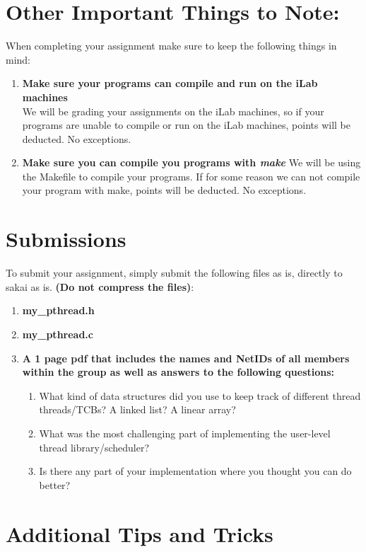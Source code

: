 \documentclass{article}
\begin{document}
\section*{Other Important Things to Note:}
When completing your assignment make sure to keep the following things in mind:
\begin{enumerate}
\item \textbf{Make sure your programs can compile and run on the iLab machines}\\
We will be grading your assignments on the iLab machines, so if your programs are unable to compile or run on the iLab machines, points will be deducted. No exceptions.
\item \textbf{Make sure you can compile you programs with \textit{make}}
We will be using the Makefile to compile your programs. If for some reason we can not compile your program with make, points will be deducted. No exceptions.
\end{enumerate}


\section*{Submissions}
To submit your assignment, simply submit the following files as is, directly to sakai as is. \textbf{(Do not compress
the files)}:
\begin{enumerate}
\item \textbf{my\_pthread.h}
\item \textbf{my\_pthread.c}
\item \textbf{A 1 page pdf that includes the names and NetIDs of all members within the group as well as answers to the following questions:}
\begin{enumerate}[a]
	\item What kind of data structures did you use to keep track of different thread threads/TCBs? A linked list? A linear array?
	\item What was the most challenging part of implementing the user-level thread library/scheduler?
	\item Is there any part of your implementation where you thought you can do better?
\end{enumerate}
\end{enumerate}

\section*{Additional Tips and Tricks}
\end{document}
